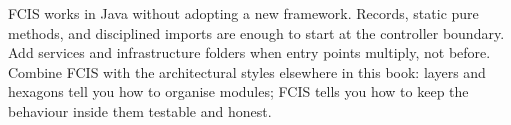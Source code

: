 FCIS works in Java without adopting a new framework. Records, static pure methods, and disciplined imports are enough to start at the controller boundary. Add services and infrastructure folders when entry points multiply, not before. Combine FCIS with the architectural styles elsewhere in this book: layers and hexagons tell you how to organise modules; FCIS tells you how to keep the behaviour inside them testable and honest.
